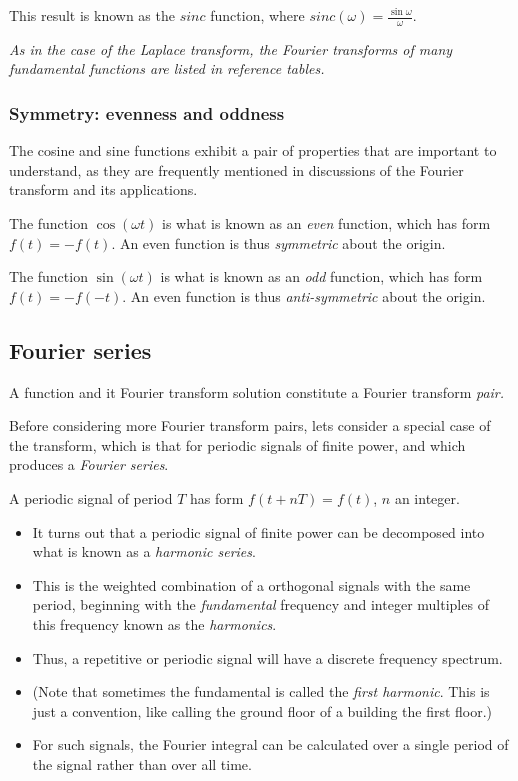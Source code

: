 \documentclass[11pt,letterpaper,draft]{exam}
\begin{document}
This result is known as the $sinc$ function, where $sinc(\omega) =  \frac{\sin\omega}{\omega}$.

\textit{As in the case of the Laplace transform, the Fourier
transforms of many fundamental functions are listed in reference tables.}

\subsubsection*{Symmetry: evenness and oddness}

The cosine and sine functions exhibit a pair of properties that are
important to understand, as they are frequently mentioned in
discussions of the Fourier transform and its applications.

The function $\cos(\omega t)$ is what is known as an \textit{even}
function, which has form $f(t) = -f(t)$. An even function is thus
\textit{symmetric} about the origin.

The function $\sin(\omega t)$ is what is known as an \textit{odd}
function, which has form $f(t) = -f(-t)$. An even function is thus
\textit{anti-symmetric} about the origin.

\subsection*{Fourier series}

A function and it Fourier transform solution constitute a Fourier
transform \textit{pair.}

Before considering more Fourier transform pairs, lets consider a
special case of the transform, which is that for periodic signals of
finite power, and which produces a \textit{Fourier series}.

A periodic signal of period $T$ has form $f(t+nT) = f(t)$, $n$ an integer.  

\begin{itemize}
\item It turns out that a periodic signal of finite power can be decomposed
into what is known as a \textit{harmonic series}.
\item This is the weighted
combination of a orthogonal signals with the same period, beginning
with the \textit{fundamental} frequency and integer multiples of this frequency
known as the \textit{harmonics}.

\item Thus, a repetitive or periodic signal will have a discrete frequency
spectrum.

\item (Note that sometimes the fundamental is called the \textit{first harmonic}.
This is just a convention, like calling the ground floor of a building
the first floor.)

\item For such signals, the Fourier integral can be calculated over a single
period of the signal rather than over all time.

\end{itemize}
\end{document}
